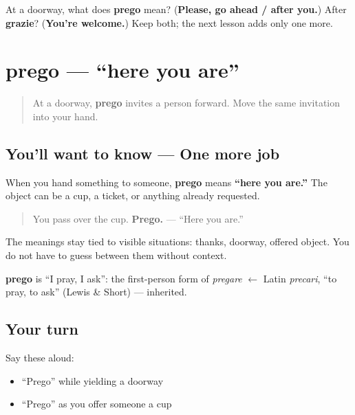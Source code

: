 \begin{tcolorbox}[breakable,colback=teal!4,colframe=teal!35!black,title={Before you move on}]
At a doorway, what does \textbf{prego} mean? (\textbf{Please, go ahead / after you.}) After \textbf{grazie}? (\textbf{You're welcome.}) Keep both; the next lesson adds only one more.
\end{tcolorbox}
\section[prego — here you are]{prego — \textquotedblleft{}here you are\textquotedblright{}}

\label{lesson:IT-C02-prego-here-you-are}



\begin{quote}
At a doorway, \textbf{prego} invites a person forward. Move the same invitation into your hand.
\end{quote}

\subsection*{You'll want to know — One more job}
When you hand something to someone, \textbf{prego} means \textbf{\textquotedblleft{}here you are.\textquotedblright{}} The object can be a cup, a ticket, or anything already requested.

\begin{quote}
You pass over the cup. \textbf{Prego.} — \textquotedblleft{}Here you are.\textquotedblright{}
\end{quote}

The meanings stay tied to visible situations: thanks, doorway, offered object. You do not have to guess between them without context.

\begin{cousinweb}
\textbf{prego} is \textquotedblleft{}I pray, I ask\textquotedblright{}: the first-person form of \emph{pregare} $\leftarrow$ Latin \emph{precari}, \textquotedblleft{}to pray, to ask\textquotedblright{} (Lewis \& Short) — inherited.
\end{cousinweb}

\subsection*{Your turn}
Say these aloud:

\begin{itemize}
\raggedright
  \item \textquotedblleft{}Prego\textquotedblright{} while yielding a doorway
  \item \textquotedblleft{}Prego\textquotedblright{} as you offer someone a cup
\end{itemize}

